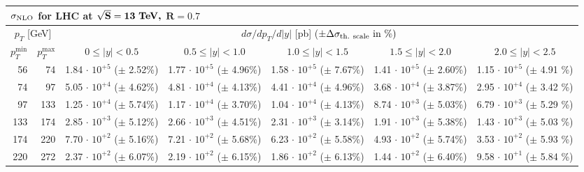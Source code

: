 
\begin{table}[h!]
\renewcommand{\arraystretch}{1.3}
\begin{center}
\begin{tabular}{|r|r|r|r|r|r|r|}
  \hline
  \multicolumn{7}{l}{$\mathbf{\sigma_{\rm NLO}}$ \bf{for LHC at} $\mathbf{\sqrt{S}=13~\mbox{\bf TeV,}}$ $\mathbf{R=0.7}$}\\ 
  \hline
  \hline
\multicolumn{2}{|c|}{$p_T$ [GeV]} &
\multicolumn{5}{|c|}{$d\sigma/dp_T/d|y|$ [pb] \quad ($\pm \Delta \sigma_{\rm th.~scale}~\mbox{in}~\%) $} \\
\multicolumn{1}{|c|}{$p_T^{\min}$} &
\multicolumn{1}{|c|}{$p_T^{\max}$} &
\multicolumn{1}{|c|}{$0 \le |y| < 0.5$} &
\multicolumn{1}{|c|}{$0.5 \le |y| < 1.0$} &
\multicolumn{1}{|c|}{$1.0 \le |y| < 1.5$} &
\multicolumn{1}{|c|}{$1.5 \le |y| < 2.0$} &
\multicolumn{1}{|c|}{$2.0 \le |y| < 2.5$} \\
\hline
%
  56 &   74 & 1.84$\,\cdot\, 10^{+5}$  ($\pm\!\!$  2.52\%) & 1.77$\,\cdot\, 10^{+5}$  ($\pm\!\!$  4.96\%) & 1.58$\,\cdot\, 10^{+5}$  ($\pm\!\!$  7.67\%) & 1.41$\,\cdot\, 10^{+5}$  ($\pm\!\!$  2.60\%) & 1.15$\,\cdot\, 10^{+5}$  ($\pm\!\!$  4.91 \%)\\
  74 &   97 & 5.05$\,\cdot\, 10^{+4}$  ($\pm\!\!$  4.62\%) & 4.81$\,\cdot\, 10^{+4}$  ($\pm\!\!$  4.13\%) & 4.41$\,\cdot\, 10^{+4}$  ($\pm\!\!$  4.96\%) & 3.68$\,\cdot\, 10^{+4}$  ($\pm\!\!$  3.87\%) & 2.95$\,\cdot\, 10^{+4}$  ($\pm\!\!$  3.42 \%)\\
  97 &  133 & 1.25$\,\cdot\, 10^{+4}$  ($\pm\!\!$  5.74\%) & 1.17$\,\cdot\, 10^{+4}$  ($\pm\!\!$  3.70\%) & 1.04$\,\cdot\, 10^{+4}$  ($\pm\!\!$  4.13\%) & 8.74$\,\cdot\, 10^{+3}$  ($\pm\!\!$  5.03\%) & 6.79$\,\cdot\, 10^{+3}$  ($\pm\!\!$  5.29 \%)\\
 133 &  174 & 2.85$\,\cdot\, 10^{+3}$  ($\pm\!\!$  5.12\%) & 2.66$\,\cdot\, 10^{+3}$  ($\pm\!\!$  4.51\%) & 2.31$\,\cdot\, 10^{+3}$  ($\pm\!\!$  3.14\%) & 1.91$\,\cdot\, 10^{+3}$  ($\pm\!\!$  5.38\%) & 1.43$\,\cdot\, 10^{+3}$  ($\pm\!\!$  5.03 \%)\\
 174 &  220 & 7.70$\,\cdot\, 10^{+2}$  ($\pm\!\!$  5.16\%) & 7.21$\,\cdot\, 10^{+2}$  ($\pm\!\!$  5.68\%) & 6.23$\,\cdot\, 10^{+2}$  ($\pm\!\!$  5.58\%) & 4.93$\,\cdot\, 10^{+2}$  ($\pm\!\!$  5.74\%) & 3.53$\,\cdot\, 10^{+2}$  ($\pm\!\!$  5.93 \%)\\
 220 &  272 & 2.37$\,\cdot\, 10^{+2}$  ($\pm\!\!$  6.07\%) & 2.19$\,\cdot\, 10^{+2}$  ($\pm\!\!$  6.15\%) & 1.86$\,\cdot\, 10^{+2}$  ($\pm\!\!$  6.13\%) & 1.44$\,\cdot\, 10^{+2}$  ($\pm\!\!$  6.40\%) & 9.58$\,\cdot\, 10^{+1}$  ($\pm\!\!$  5.84 \%)\\

\end{tabular}
\end{center}
\end{table}
